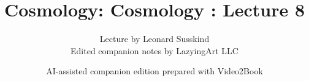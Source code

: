 \documentclass[11pt,oneside]{book}
\begin{document}
\frontmatter
\title{Cosmology: Cosmology : Lecture 8}
\author{Lecture by Leonard Susskind\\Edited companion notes by LazyingArt LLC}
\date{AI-assisted companion edition prepared with Video2Book}
\maketitle
\clearpage
\mainmatter

\end{document}
